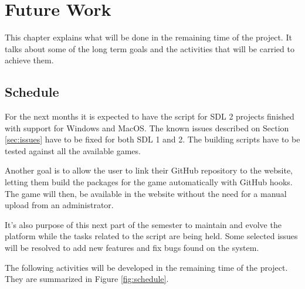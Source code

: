 
\chapter{Future Work}
\label{sec:future_work}

This chapter explains what will be done in the remaining time of the project. It talks about some of the long term goals and the activities that will be carried to achieve them.

\section{Schedule}
\label{sec:schedule}

For the next months it is expected to have the script for SDL 2 projects finished with support for Windows and MacOS. The known issues described on Section \ref{sec:issues} have to be fixed for both SDL 1 and 2. The building scripts have to be tested against all the available games.

Another goal is to allow the user to link their GitHub repository to the website, letting them build the packages for the game automatically with GitHub hooks. The game will then, be available in the website without the need for a manual upload from an administrator.

It's also purpose of this next part of the semester to maintain and evolve the platform while the tasks related to the script are being held. Some selected issues will be resolved to add new features and fix bugs found on the system.

The following activities will be developed in the remaining time of the project. They are summarized in Figure \ref{fig:schedule}.

